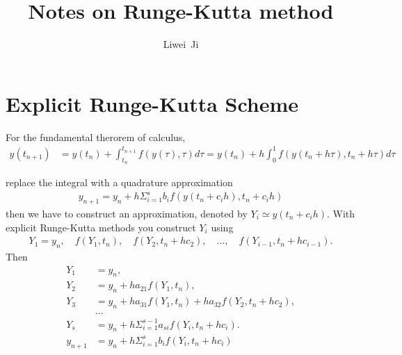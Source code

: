 \documentclass[prd,aps,a4paper,superscriptaddress,onecolumn,footinbib]{revtex4}
\begin{document}
\title{Notes on Runge-Kutta method}

\author{Liwei~Ji}

\maketitle

\tableofcontents



\section{Explicit Runge-Kutta Scheme}

For the fundamental therorem of calculus,
\begin{align}
    y(t_{n+1})
    &=y(t_n)+\int_{t_n}^{t_{n+1}}f(y(\tau),\tau)d\tau
    =y(t_n)+h\int_0^1f(y(t_n+h\tau), t_n+h\tau)d\tau
\end{align}

replace the integral with a quadrature approximation
\begin{align}
    y_{n+1}=y_n+h\Sigma_{i=1}^s b_if(y(t_n+c_ih), t_n+c_ih)
\end{align}
then we have to construct an approximation, denoted by $Y_i\simeq y(t_n+c_ih)$.
With explicit Runge-Kutta methods you construct $Y_i$ using
\begin{align}
    Y_1=y_n,\quad
    f(Y_1, t_n),\quad
    f(Y_2, t_n+hc_2), \quad
    ..., \quad
    f(Y_{i-1}, t_n+hc_{i-1}).
\end{align}
Then
\begin{align}
    Y_1&=y_n, \\
    Y_2&=y_n+h a_{21}f(Y_1,t_n), \\
    Y_3&=y_n+h a_{31}f(Y_1,t_n) + h a_{32}f(Y_2, t_n+h c_2), \\
       &... \\
    Y_s&=y_n+h\Sigma_{i=1}^{s-1}a_{si}f(Y_i, t_n+h c_i). \\
    y_{n+1}
       &=y_n+h\Sigma_{i=1}^sb_if(Y_i, t_n+h c_i)
\end{align}
\end{document}
